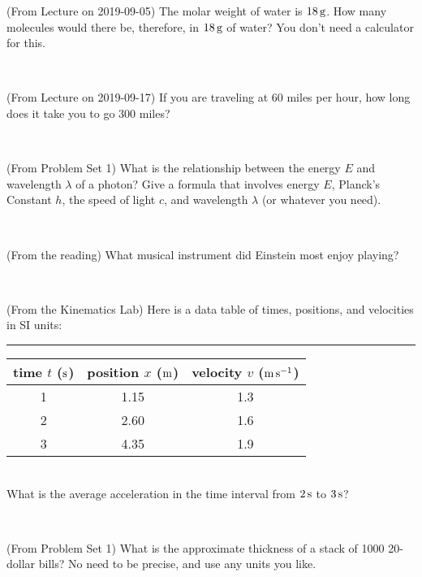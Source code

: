 \documentclass[12pt, letterpaper]{article}
\begin{document}
\begin{problem} (From Lecture on 2019-09-05)
The molar weight of water is $18\,\mathrm{g}$. How many molecules would there
be, therefore, in $18\,\mathrm{g}$ of water? You don't need a calculator for
this.
\end{problem}


\vfill ~

\begin{problem} (From Lecture on 2019-09-17)
If you are traveling at 60 miles per hour, how long does
it take you to go 300 miles?
\end{problem}


\vfill ~


\clearpage


\begin{problem} (From Problem Set 1)
What is the relationship between the energy $E$ and wavelength
$\lambda$ of a photon? Give a formula that involves energy $E$,
Planck's Constant $h$, the speed of light $c$, and wavelength
$\lambda$ (or whatever you need).
\end{problem}

\vfill ~

\begin{problem} (From the reading)
What musical instrument did Einstein most enjoy playing?
\end{problem}


\vfill ~

\begin{problem} (From the Kinematics Lab)
Here is a data table of times, positions, and velocities in SI units:\\
\rule{1.0in}{0pt}\begin{tabular}{c|c|c}
time $t$ ($\mathrm{s}$) & position $x$ ($\mathrm{m}$) & velocity $v$ ($\mathrm{m}\,\mathrm{s}^{-1}$) \\
\hline
1 & 1.15 & 1.3 \\
2 & 2.60 & 1.6 \\
3 & 4.35 & 1.9 \\
\hline
\end{tabular}\\
What is the average acceleration in the time interval from $2\,\mathrm{s}$ to $3\,\mathrm{s}$?
\end{problem}


\vfill ~

\begin{problem} (From Problem Set 1)
What is the approximate thickness of a stack of 1000 20-dollar bills?
No need to be precise, and use any units you like.
\end{problem}
\end{document}
